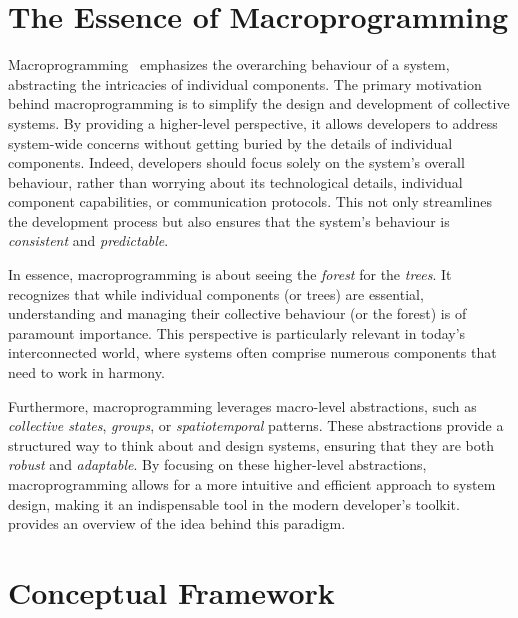 \section{The Essence of Macroprogramming}
Macroprogramming~\cite{casadei2023macroprogramming} emphasizes the overarching behaviour of a system, 
 abstracting the intricacies of individual components. 
%
The primary motivation behind macroprogramming 
 is to simplify the design and development of collective systems. 
 By providing a higher-level perspective, 
 it allows developers to address system-wide concerns without getting buried by the details of individual components. 
 Indeed, developers should focus solely on the system's overall behaviour, 
 rather than worrying about its technological details, 
 individual component capabilities, or communication protocols.
This not only streamlines the development process but also ensures that the system's behaviour is \emph{consistent} and \emph{predictable}.

In essence, macroprogramming is about seeing the \emph{forest} for the \emph{trees}. 
 It recognizes that while individual components (or trees) are essential,
 understanding and managing their collective behaviour (or the forest) is of paramount importance. 
This perspective is particularly relevant in today's interconnected world, 
 where systems often comprise numerous components that need to work in harmony.

Furthermore, macroprogramming leverages macro-level abstractions, 
 such as \emph{collective states}, \emph{groups}, or \emph{spatiotemporal} patterns. 
 These abstractions provide a structured way to think about and design systems, 
 ensuring that they are both \emph{robust} and \emph{adaptable}. 
By focusing on these higher-level abstractions, 
 macroprogramming allows for a more intuitive and efficient approach to system design, 
 making it an indispensable tool in the modern developer's toolkit.
 provides an overview of the idea behind this paradigm.

\section{Conceptual Framework}

